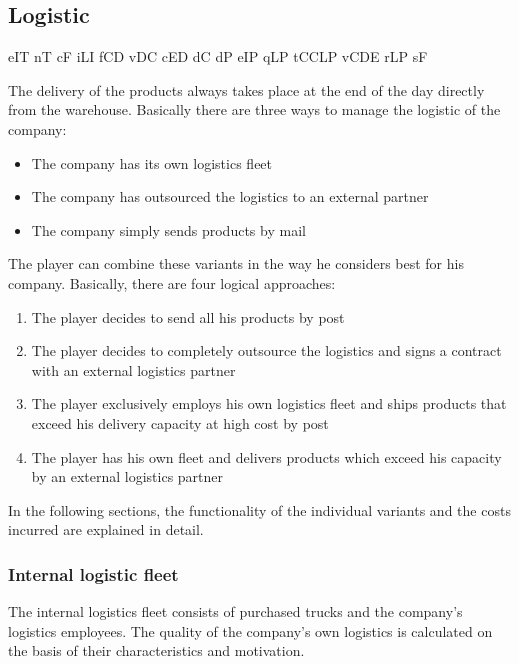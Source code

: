 \subsection{Logistic} \label{logistic_simulation}

\gls{eIT}  %
\gls{nT}   %
\gls{cF}   %
\gls{iLI}  %
\gls{fCD}  %
\gls{vDC}  %
\gls{cED}  %
\gls{dC}   %
\gls{dP}   %
\gls{eIP}  %
\gls{qLP}  %
\gls{tCCLP}%
\gls{vCDE} %
\gls{rLP}  %
\gls{sF}   %


The delivery of the products always takes place at the end of the day directly from the warehouse. Basically there are three ways to manage the logistic of the company: 
\begin{itemize}
    \item The company has its own logistics fleet
    \item The company has outsourced the logistics to an external partner
    \item The company simply sends products by mail
\end{itemize}

The player can combine these variants in the way he considers best for his company. Basically, there are four logical approaches:
\begin{enumerate}
    \item The player decides to send all his products by post 
    \item The player decides to completely outsource the logistics and signs a contract with an external logistics partner
    \item The player exclusively employs his own logistics fleet and ships products that exceed his delivery capacity at high cost by post
    \item The player has his own fleet and delivers products which exceed his capacity by an external logistics partner
\end{enumerate}
	
In the following sections, the functionality of the individual variants and the costs incurred are explained in detail.


\subsubsection{Internal logistic fleet}
The internal logistics fleet consists of purchased trucks and the company's logistics employees. The quality of the company's own logistics is calculated on the basis of their characteristics and motivation.

